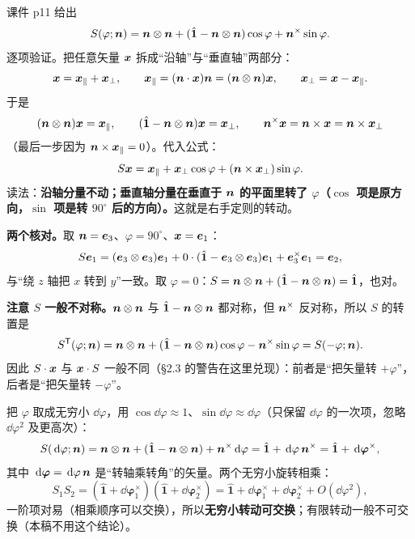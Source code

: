 \documentclass[11pt]{ctexart}
\newcommand{\ten}[1]{\mathbf{#1}}
\newcommand{\unitd}{\hat{\ten{1}}}
\let\origsubhdr\subhdr
\renewcommand{\subhdr}[1]{\par\needspace{3\baselineskip}\origsubhdr{#1}}
\begin{document}
\label{subsec:axisformula}

课件 p11 给出
\[
S(\varphi;\vect n)=\vect n\otimes\vect n+(\unitd-\vect n\otimes\vect n)\cos\varphi+\vect n^{\times}\sin\varphi .
\]
逐项验证。把任意矢量 $\boldsymbol{x}$ 拆成“沿轴”与“垂直轴”两部分：
\[
\boldsymbol{x}=\boldsymbol{x}_\parallel+\boldsymbol{x}_\perp,\qquad
\boldsymbol{x}_\parallel=(\boldsymbol{n}\cdot\boldsymbol{x})\boldsymbol{n}=(\boldsymbol{n}\otimes\boldsymbol{n})\boldsymbol{x},\qquad
\boldsymbol{x}_\perp=\boldsymbol{x}-\boldsymbol{x}_\parallel .
\]
于是
\[
(\vect n\otimes\vect n)\vect x=\vect x_\parallel,\qquad
(\unitd-\vect n\otimes\vect n)\vect x=\vect x_\perp,\qquad
\vect n^{\times}\vect x=\vect n\times\vect x=\vect n\times\vect x_\perp
\]
（最后一步因为 $\boldsymbol{n}\times\boldsymbol{x}_\parallel=0$）。代入公式：
\[
S\boldsymbol{x}=\boldsymbol{x}_\parallel+\boldsymbol{x}_\perp\cos\varphi+(\boldsymbol{n}\times\boldsymbol{x}_\perp)\sin\varphi .
\]
读法：\textbf{沿轴分量不动；垂直轴分量在垂直于 $\boldsymbol{n}$ 的平面里转了 $\varphi$（$\cos$ 项是原方向，$\sin$ 项是转 $90^\circ$ 后的方向）。}这就是右手定则的转动。

\textbf{两个核对。}取 $\boldsymbol{n}=\boldsymbol{e}_3$、$\varphi=90^\circ$、$\boldsymbol{x}=\boldsymbol{e}_1$：
\[
S\vect e_1=(\vect e_3\otimes\vect e_3)\vect e_1+0\cdot(\unitd-\vect e_3\otimes\vect e_3)\vect e_1+\vect e_3^{\times}\vect e_1=\vect e_2,
\]
与“绕 $z$ 轴把 $x$ 转到 $y$”一致。取 $\varphi=0$：$S=\vect n\otimes\vect n+(\unitd-\vect n\otimes\vect n)=\unitd$，也对。

\textbf{注意 $S$ 一般不对称。}$\boldsymbol{n}\otimes\boldsymbol{n}$ 与 $\unitd-\vect n\otimes\vect n$ 都对称，但 $\boldsymbol{n}^{\times}$ 反对称，所以 $S$ 的转置是
\[
S^{\mathsf T}(\varphi;\vect n)=\vect n\otimes\vect n+(\unitd-\vect n\otimes\vect n)\cos\varphi-\vect n^{\times}\sin\varphi=S(-\varphi;\vect n).
\]
因此 $S\cdot\boldsymbol{x}$ 与 $\boldsymbol{x}\cdot S$ 一般不同（\S2.3 的警告在这里兑现）：前者是“把矢量转 $+\varphi$”，后者是“把矢量转 $-\varphi$”。

\label{subsec:angularvelocity}

把 $\varphi$ 取成无穷小 $\dd\varphi$，用 $\cos\dd\varphi\approx1$、$\sin\dd\varphi\approx\dd\varphi$（只保留 $\dd\varphi$ 的一次项，忽略 $\dd\varphi^2$ 及更高次）：
\[
S(\dd\varphi;\vect n)=\vect n\otimes\vect n+(\unitd-\vect n\otimes\vect n)+\vect n^{\times}\dd\varphi
=\unitd+\dd\varphi\,\vect n^{\times}=\unitd+\dd{\boldsymbol\varphi}^{\times},
\]
其中 $\,\mathrm{d}{\boldsymbol\varphi}=\,\mathrm{d}\varphi\,\boldsymbol{n}$ 是“转轴乘转角”的矢量。两个无穷小旋转相乘：
\[
S_1S_2=(\unitd+\dd{\boldsymbol\varphi}_1^{\times})(\unitd+\dd{\boldsymbol\varphi}_2^{\times})
=\unitd+\dd{\boldsymbol\varphi}_1^{\times}+\dd{\boldsymbol\varphi}_2^{\times}+O(\dd\varphi^2),
\]
一阶项对易（相乘顺序可以交换），所以\textbf{无穷小转动可交换}；有限转动一般不可交换（本稿不用这个结论）。
\end{document}
